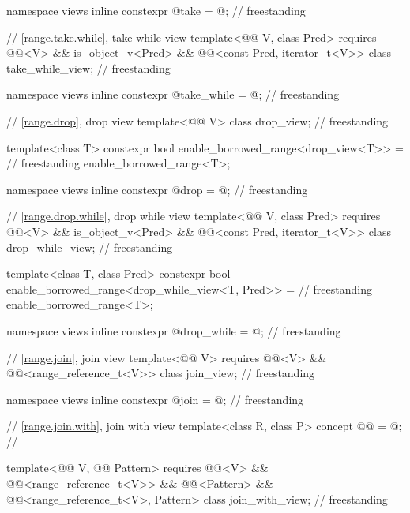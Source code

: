 \begin{codeblock}
{  namespace views { inline constexpr @\unspecnc@ take = @\unspecnc@; }              // freestanding

  // \ref{range.take.while}, take while view
  template<@@ V, class Pred>
    requires @@<V> && is_object_v<Pred> &&
             @@<const Pred, iterator_t<V>>
    class take_while_view;                                                          // freestanding

  namespace views { inline constexpr @\unspecnc@ take_while = @\unspecnc@; }        // freestanding

  // \ref{range.drop}, drop view
  template<@@ V>
    class drop_view;                                                                // freestanding

  template<class T>
    constexpr bool enable_borrowed_range<drop_view<T>> =                            // freestanding
      enable_borrowed_range<T>;

  namespace views { inline constexpr @\unspecnc@ drop = @\unspecnc@; }              // freestanding

  // \ref{range.drop.while}, drop while view
  template<@@ V, class Pred>
    requires @@<V> && is_object_v<Pred> &&
             @@<const Pred, iterator_t<V>>
    class drop_while_view;                                                          // freestanding

  template<class T, class Pred>
    constexpr bool enable_borrowed_range<drop_while_view<T, Pred>> =                // freestanding
      enable_borrowed_range<T>;

  namespace views { inline constexpr @\unspecnc@ drop_while = @\unspecnc@; }        // freestanding

  // \ref{range.join}, join view
  template<@@ V>
    requires @@<V> && @@<range_reference_t<V>>
  class join_view;                                                                  // freestanding

  namespace views { inline constexpr @\unspecnc@ join = @\unspecnc@; }              // freestanding

  // \ref{range.join.with}, join with view
  template<class R, class P>
    concept @@ = @\seebelow@; // \expos

  template<@@ V, @@ Pattern>
    requires @@<V> && @@<range_reference_t<V>>
          && @@<Pattern>
          && @@<range_reference_t<V>, Pattern>
  class join_with_view;                                                             // freestanding

}
\end{codeblock}
